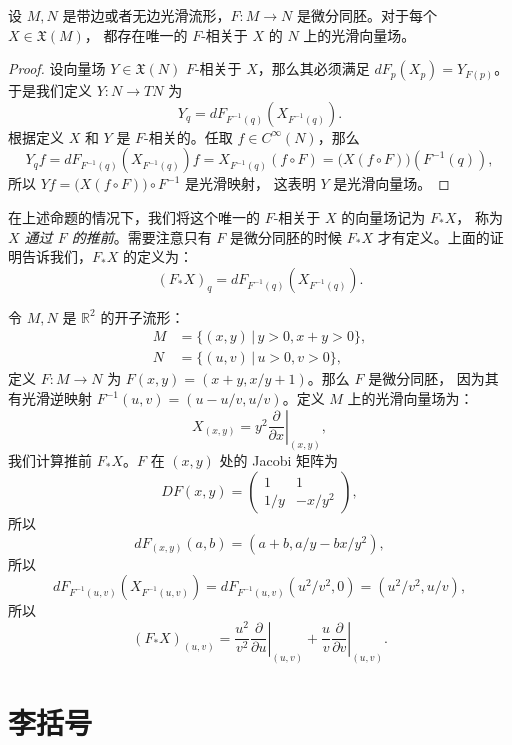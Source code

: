 \documentclass[fontset=none]{Notes}
\begin{document}
\begin{proposition}
  设 $M,N$ 是带边或者无边光滑流形，$F:M\to N$ 是微分同胚。对于每个 $X\in \mathfrak X(M)$，
  都存在唯一的 $F$-相关于 $X$ 的 $N$ 上的光滑向量场。
\end{proposition}
\begin{proof}
  设向量场 $Y\in \mathfrak X(N)$ $F$-相关于 $X$，那么其必须满足 $dF_p(X_p)=Y_{F(p)}$。
  于是我们定义 $Y:N\to TN$ 为
  \[
    Y_q=dF_{F^{-1}(q)}\left(X_{F^{-1}(q)}\right).
  \]
  根据定义 $X$ 和 $Y$ 是 $F$-相关的。任取 $f\in C^\infty(N)$，那么
  \[
    Y_qf=dF_{F^{-1}(q)}\left(X_{F^{-1}(q)}\right)f=
    X_{F^{-1}(q)}(f\circ F)=\bigl(X(f\circ F)\bigr)(F^{-1}(q)),
  \]
  所以 $Yf=\bigl(X(f\circ F)\bigr)\circ F^{-1}$ 是光滑映射，
  这表明 $Y$ 是光滑向量场。
\end{proof}

在上述命题的情况下，我们将这个唯一的 $F$-相关于 $X$ 的向量场记为 $F_*X$，
称为\emph{$X$ 通过 $F$ 的推前}。需要注意只有 $F$ 是微分同胚的时候 $F_*X$
才有定义。上面的证明告诉我们，$F_*X$ 的定义为：
\begin{equation}
  (F_*X)_q=dF_{F^{-1}(q)}\left(X_{F^{-1}(q)}\right).
\end{equation}

\begin{example}[向量场推前的计算]
  令 $M,N$ 是 $\mathbb{R}^2$ 的开子流形：
  \begin{align*}
    M&=\{(x,y)\,|\, y>0,x+y>0\},\\
    N&=\{(u,v)\,|\, u>0,v>0\},
  \end{align*}
  定义 $F:M\to N$ 为 $F(x,y)=(x+y,x/y+1)$。那么 $F$ 是微分同胚，
  因为其有光滑逆映射 $F^{-1}(u,v)=(u-u/v,u/v)$。定义 $M$
  上的光滑向量场为：
  \[
    X_{(x,y)}=y^2\left.\frac{\partial}{\partial x}\right|_{(x,y)}  ,
  \]
  我们计算推前 $F_*X$。$F$ 在 $(x,y)$ 处的 Jacobi 矩阵为
  \[
    DF(x,y)=\begin{pmatrix}
      1 & 1 \\ 
      1/y & -x/y^2
    \end{pmatrix} ,
  \]
  所以
  \[
    dF_{(x,y)}(a,b)=\left(a+b,a/y-bx/y^2\right),  
  \]
  所以
  \[
    dF_{F^{-1}(u,v)}\left(X_{F^{-1}(u,v)}\right)=  
    dF_{F^{-1}(u,v)}(u^2/v^2,0)=
    \left(u^2/v^2,u/v\right),
  \]
  所以
  \[
    (F_*X)_{(u,v)}=\frac{u^2}{v^2}\left.\frac{\partial}{\partial u}\right|_{(u,v )}  
    +\frac{u}{v}\left.\frac{\partial}{\partial v}\right|_{(u,v)} .
  \]
\end{example}

\section{李括号}
\end{document}
